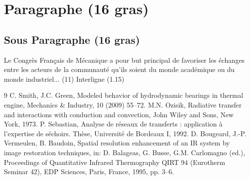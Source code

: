 \documentclass[11pt,a4paper]{article}
\begin{document}
\section{Paragraphe (16 gras)}

\subsection{Sous Paragraphe (16 gras)}
\medskip
Le Congr\`es Fran\c{c}ais de M\'ecanique a pour but principal de favoriser les 
\'echanges entre les acteurs de la communaut\'e qu'ils soient du monde acad\'emique 
ou du monde industriel... (11) Interligne (1.15)


\begin{thebibliography}{9}
\bigskip
	C. Smith, J.C. Green, 
	Modeled behavior of hydrodynamic bearings in thermal engine, 
	Mechanics \& Industry,
	10 (2009) 55--72.
  	M.N. Ozisik,
	Radiative transfer and interactions with conduction and convection, 
	John Wiley and Sons, 
	New York, 
	1973.
  	P. Sebastian,
	Analyse de réseaux de transferts : application à l'expertise de séchoirs.
	Thèse,
	Université de Bordeaux I,
	1992.
  	D. Bougeard, J.-P. Vermeulen, B. Baudoin, 
	Spatial resolution enhancement of an IR system by image restoration techniques,
	in: D. Balageas, G. Busse, G.M. Carlomagno (ed.), 
	Proceedings of Quantitative Infrared Thermography QIRT 94 (Eurotherm Seminar 42),
	EDP Sciences,
	Paris, France, 
	1995, pp. 3--6.

\end{thebibliography}


%
\end{document}
